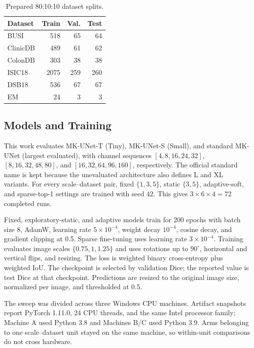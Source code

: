 \documentclass[conference]{IEEEtran}
\begin{document}
\begin{table}[t]
\caption{Prepared 80:10:10 dataset splits.}
\label{tab:data}
\centering
\footnotesize
\begin{tabular}{lrrr}
\toprule
Dataset & Train & Val. & Test \\
\midrule
BUSI     & 518  & 65  & 64  \\
ClinicDB & 489  & 61  & 62  \\
ColonDB  & 303  & 38  & 38  \\
ISIC18   & 2075 & 259 & 260 \\
DSB18    & 536  & 67  & 67  \\
EM       & 24   & 3   & 3   \\
\bottomrule
\end{tabular}
\end{table}

\subsection{Models and Training}
This work evaluates MK-UNet-T (Tiny), MK-UNet-S (Small), and standard MK-UNet (largest evaluated), with channel sequences $[4,8,16,24,32]$, $[8,16,32,48,80]$, and $[16,32,64,96,160]$, respectively. The official standard name is kept because the unevaluated architecture also defines L and XL variants. For every scale--dataset pair, fixed $\{1,3,5\}$, static $\{3,5\}$, adaptive-soft, and sparse-top-1 settings are trained with seed 42. This gives $3\times6\times4=72$ completed runs.

Fixed, exploratory-static, and adaptive models train for 200 epochs with batch size 8, AdamW, learning rate $5\times10^{-4}$, weight decay $10^{-4}$, cosine decay, and gradient clipping at 0.5. Sparse fine-tuning uses learning rate $3\times10^{-4}$. Training evaluates image scales $\{0.75,1,1.25\}$ and uses rotations up to $90^\circ$, horizontal and vertical flips, and resizing. The loss is weighted binary cross-entropy plus weighted IoU. The checkpoint is selected by validation Dice; the reported value is test Dice at that checkpoint. Predictions are resized to the original image size, normalized per image, and thresholded at 0.5.

The sweep was divided across three Windows CPU machines. Artifact snapshots report PyTorch 1.11.0, 24 CPU threads, and the same Intel processor family; Machine A used Python 3.8 and Machines B/C used Python 3.9. Arms belonging to one scale--dataset unit stayed on the same machine, so within-unit comparisons do not cross hardware.
\end{document}
